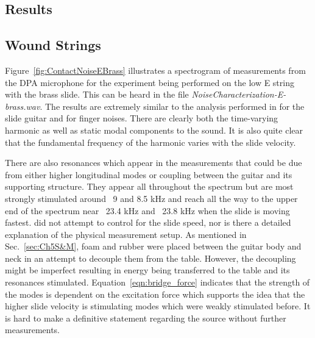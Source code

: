 \documentclass[../main.tex]{subfiles}
\begin{document}
\subsection{Results}
\subsection{Wound Strings}
Figure~\ref{fig:ContactNoiseEBrass} illustrates a spectrogram of measurements from the DPA microphone for the experiment being performed on the low E string with the brass slide. This can be heard in the file \emph{NoiseCharacterization-E-brass.wav}. The results are extremely similar to the analysis performed in  for the slide guitar and  for finger noises. There are clearly both the time-varying harmonic as well as static modal components to the sound. It is also quite clear that the fundamental frequency of the harmonic varies with the slide velocity. 

There are also resonances which appear in the measurements that could be due from either higher longitudinal modes or coupling between the guitar and its supporting structure. They appear all throughout the spectrum but are most strongly stimulated around ~9 and 8.5 kHz and reach all the way to the upper end of the spectrum near ~23.4 kHz and ~23.8 kHz when the slide is moving fastest.  did not attempt to control for the slide speed, nor is there a detailed explanation of the physical measurement setup. As mentioned in Sec.~\ref{sec:Ch5S&M}, foam and rubber were placed between the guitar body and neck in an attempt to decouple them from the table. However, the decoupling might be imperfect resulting in energy being transferred to the table and its resonances stimulated. Equation~\ref{eqn:bridge_force} indicates that the strength of the modes is dependent on the excitation force which supports the idea that the higher slide velocity is stimulating modes which were weakly stimulated before. It is hard to make a definitive statement regarding the source without further measurements.
\end{document}
